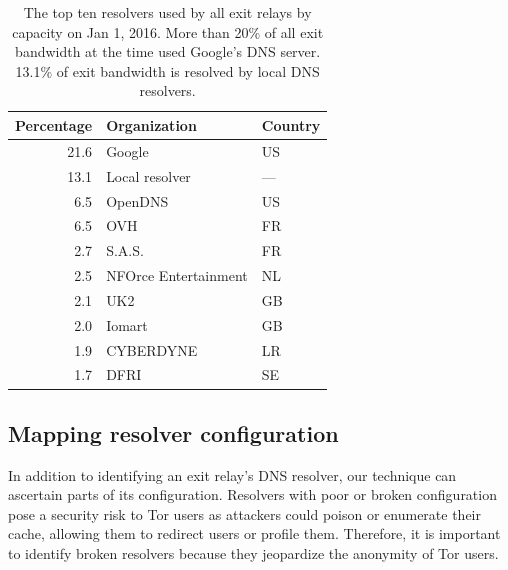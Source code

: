\begin{table}[t]
	\centering
	\begin{tabular}{r l l}
	\toprule
	\textbf{Percentage} & \textbf{Organization} & \textbf{Country} \\
	\midrule
21.6 & Google & US \\ %
13.1 & Local resolver & --- \\ %
6.5 & OpenDNS & US \\ %
6.5 & OVH & FR \\ %
2.7 & S.A.S. & FR \\ %
2.5 & NFOrce Entertainment & NL \\ %
2.1 & UK2 & GB \\ %
2.0 & Iomart & GB \\ %
1.9 & CYBERDYNE & LR \\ %
1.7 & DFRI & SE \\ %

	\bottomrule
	\end{tabular}
	\caption{The top ten resolvers used by all exit relays by capacity on Jan 1,
	2016.  More than 20\% of all exit bandwidth at the time used Google's DNS
	server.  13.1\% of exit bandwidth is resolved by local DNS resolvers.}
	\label{tab:dns-resolvers}
\end{table}


\subsection{Mapping resolver configuration}
In addition to identifying an exit relay's DNS resolver, our technique can
ascertain parts of its configuration.  Resolvers with poor or broken
configuration pose a security risk to Tor users as attackers could poison or
enumerate their cache, allowing them to redirect users or profile them.
Therefore, it is important to identify broken resolvers because they jeopardize
the anonymity of Tor users.

